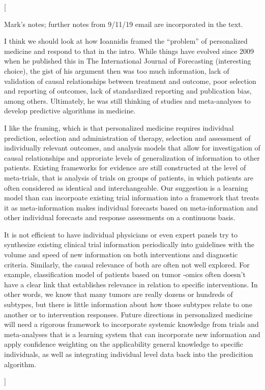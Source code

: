 \documentclass[twocolumn]{bmcart}%
\newcommand{\todo}[1]{{\color{red} [\bf{#1}]}}
\begin{document}
\todo{
  Mark's notes; further notes from 9/11/19 email are incorporated in the text.

  I think we should look at how Ioannidis framed the ``problem'' of
  personalized medicine and respond to that in the intro.  While things have
  evolved since 2009 when he published this in The International Journal of
  Forecasting (interesting choice), the gist of his argument then was too much
  information, lack of validation of causal relationships between treatment and
  outcome, poor selection and reporting of outcomes, lack of standardized
  reporting and publication bias, among others.  Ultimately, he was still
  thinking of studies and meta-analyses to develop predictive algorithms in
  medicine.

  I like the framing, which is that personalized medicine requires individual
  prediction, selection and administration of therapy, selection and assessment
  of individually relevant outcomes, and analysis models that allow for
  investigation of causal relationships and approriate levels of generalization
  of information to other patients.  Existing frameworks for evidence are still
  constructed at the level of meta-trials, that is analysis of trials on groups
  of patients, in which patients are often considered as identical and
  interchangeable.  Our suggestion is a learning model than can incorpoate
  existing trial information into a framework that treats it as
  meta-information makes individual forecasts based on meta-information and
  other individual forecasts and response assessments on a continuous basis.

  It is not efficient to have individual physicians or even expert panels try
  to synthesize existing clinical trial information periodically into
  guidelines with the volume and speed of new information on both interventions
  and diagnostic criteria.  Similarly, the causal relevance of both are often
  not well explored.  For example, classification model of patients based on
  tumor -omics often doesn't have a clear link that establishes relevance in
  relation to specific interventions.  In other words, we know that many tumors
  are really dozens or hundreds of subtypes, but there is little information
  about how those subtypes relate to one another or to intervention responses.
  Future directions in personalized medicine will need a rigorous framework to
  incorporate systemic knowledge from trials and meta-analyses that is a
  learning system that can incorporate new information and apply confidence
  weighting on the applicability general knowledge to specific individuals, as
  well as integrating individual level data back into the predicition
  algorithm.}
\end{document}
